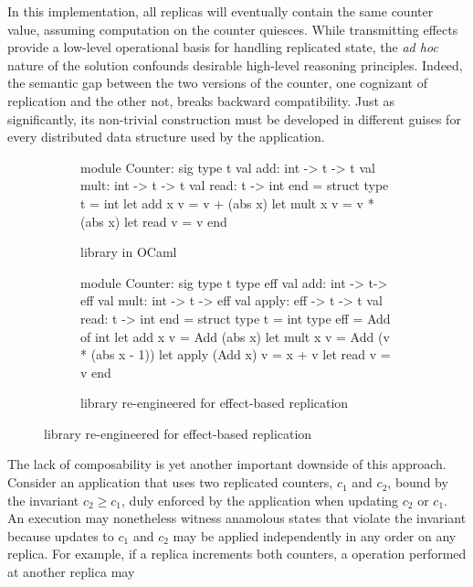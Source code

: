 In this implementation, all replicas will eventually contain the same
counter value, assuming computation on the counter quiesces.  While
transmitting effects provide a low-level operational basis for
handling replicated state, the \emph{ad hoc} nature of the solution
confounds desirable high-level reasoning principles.  Indeed, the
semantic gap between the two versions of the counter, one cognizant of
replication and the other not, breaks backward compatibility.  Just as
significantly, its non-trivial construction must be developed in
different guises for every distributed data structure used by the
application.
\begin{figure}
\begin{subfigure}[b]{0.4\textwidth}
  \begin{ocaml}
    module Counter: sig
      type t
      val add: int -> t -> t
      val mult: int -> t -> t
      val read: t -> int
    end = struct
      type t = int
      let add x v = v + (abs x)
      let mult x v = v * (abs x)
      let read v = v
    end
  \end{ocaml}
\caption{ library in OCaml}
\label{fig:counter-adt}
\end{subfigure}
\begin{subfigure}[b]{0.56\textwidth}
  \begin{ocaml}
    module Counter: sig
      type t
      type eff 
      val add: int -> t-> eff
      val mult: int -> t -> eff
      val apply: eff -> t -> t
      val read: t -> int
    end = struct
      type t = int
      type eff = Add of int
      let add x v = Add (abs x)
      let mult x v = Add (v * (abs x - 1))
      let apply (Add x) v = x + v
      let read v = v
    end
  \end{ocaml}
\caption{ library re-engineered for effect-based replication}
\label{fig:counter-rdt}
\end{subfigure}
\end{figure}
The lack of composability is yet another important downside of this
approach.  Consider an application that uses two replicated counters,
$c_1$ and $c_2$, bound by the invariant $c_2 \ge c_1$, duly enforced
by the application when updating $c_2$ or $c_1$.  An execution may
nonetheless witness anamolous states that violate the invariant
because updates to $c_1$ and $c_2$ may be applied independently in any
order on any replica.  For example, if a replica increments both
counters, a  operation performed at another replica may

